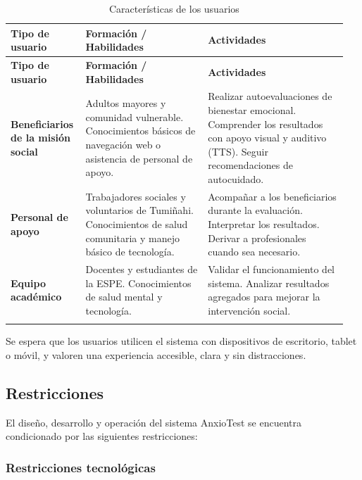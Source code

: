 \begin{longtable}{p{0.20\linewidth} p{0.35\linewidth} p{0.40\linewidth}}
\toprule
\rowcolor{tableheader!20}
\textbf{Tipo de usuario} & \textbf{Formación / Habilidades} & \textbf{Actividades} \\
\midrule
\endfirsthead
\rowcolor{tableheader!20}
\textbf{Tipo de usuario} & \textbf{Formación / Habilidades} & \textbf{Actividades} \\
\midrule
\endhead
\bottomrule
\endfoot
\textbf{Beneficiarios de la misión social}
  & Adultos mayores y comunidad vulnerable. Conocimientos básicos de navegación web o asistencia de personal de apoyo.
  & Realizar autoevaluaciones de bienestar emocional. Comprender los resultados con apoyo visual y auditivo (TTS). Seguir recomendaciones de autocuidado. \\
\textbf{Personal de apoyo}
  & Trabajadores sociales y voluntarios de Tumiñahi. Conocimientos de salud comunitaria y manejo básico de tecnología.
  & Acompañar a los beneficiarios durante la evaluación. Interpretar los resultados. Derivar a profesionales cuando sea necesario. \\
\textbf{Equipo académico}
  & Docentes y estudiantes de la ESPE. Conocimientos de salud mental y tecnología.
  & Validar el funcionamiento del sistema. Analizar resultados agregados para mejorar la intervención social. \\
\bottomrule
\caption{Características de los usuarios}
\label{tab:usuarios}
\end{longtable}

Se espera que los usuarios utilicen el sistema con dispositivos de escritorio, tablet o móvil, y valoren una experiencia accesible, clara y sin distracciones.

\subsection{Restricciones}
\label{sec:restricciones}

El diseño, desarrollo y operación del sistema AnxioTest se encuentra condicionado por las siguientes restricciones:

\subsubsection{Restricciones tecnológicas}

